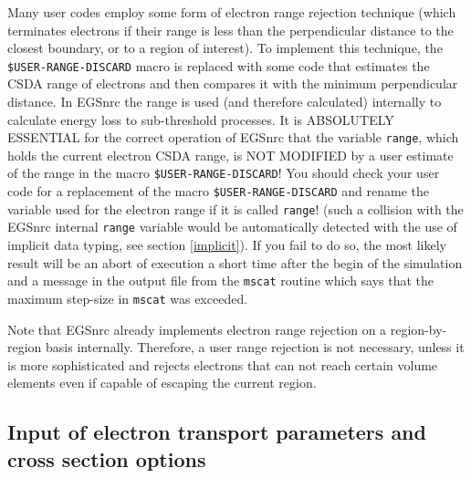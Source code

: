 Many user codes employ some form of electron range rejection technique 
(which terminates electrons if their range is 
less than the perpendicular distance to the closest boundary, 
or to a region of interest). 
To implement this technique, the 
{\tt \$USER-RANGE-DISCARD} macro is replaced 
with some code that estimates the CSDA range of electrons 
and then compares it with the minimum perpendicular distance.  
In EGSnrc the range is used (and therefore calculated) internally 
to calculate energy loss to sub-threshold processes. 
It is ABSOLUTELY ESSENTIAL for the correct operation of EGSnrc that 
the variable {\tt range}, which holds the current electron CSDA 
range, is NOT MODIFIED by a user estimate of the range in 
the macro {\tt \$USER-RANGE-DISCARD}! You should 
check your user code for a replacement of the macro 
{\tt \$USER-RANGE-DISCARD} and rename the variable 
used for the electron range if it is called {\tt range}! 
(such a collision with the EGSnrc internal {\tt range} 
variable would be automatically detected with the use 
of implicit data typing, see section \ref{implicit}). If you fail 
to do so, the most likely result will be an abort 
of execution a short time after the begin of the simulation 
and a message in the output file from the {\tt mscat} routine 
which says that the maximum step-size in {\tt mscat} was exceeded. 

Note that EGSnrc already implements electron range rejection 
on a region-by-region basis internally. Therefore, 
a user range rejection is not necessary, unless 
it is more sophisticated and rejects electrons 
that can not reach certain volume elements even if capable of 
escaping the current region. 

\subsection{Input of electron transport parameters 
and cross section options}
\label{parameter_input}

